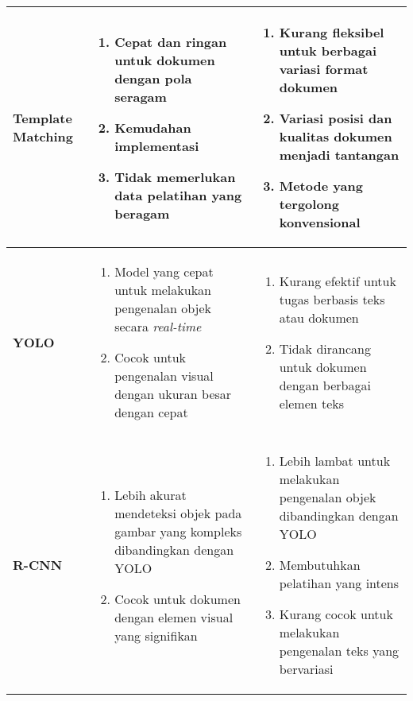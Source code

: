 \begin{table}[h!]
\begin{tabularx}{\linewidth}{|p{2cm}|X|X|}
\textbf{Template Matching} &
\begin{enumerate}
    \item Cepat dan ringan untuk dokumen dengan pola seragam
    \item Kemudahan implementasi
    \item Tidak memerlukan data pelatihan yang beragam
\end{enumerate}
&
\begin{enumerate}
    \item Kurang fleksibel untuk berbagai variasi format dokumen
    \item Variasi posisi dan kualitas dokumen menjadi tantangan
    \item Metode yang tergolong konvensional
\end{enumerate}
\\ \hline

\textbf{YOLO} &
\begin{enumerate}
    \item Model yang cepat untuk melakukan pengenalan objek secara \textit{real-time}
    \item Cocok untuk pengenalan visual dengan ukuran besar dengan cepat
\end{enumerate}
&
\begin{enumerate}
    \item Kurang efektif untuk tugas berbasis teks atau dokumen
    \item Tidak dirancang untuk dokumen dengan berbagai elemen teks
\end{enumerate}
\\ \hline
\textbf{R-CNN} &
\begin{enumerate}
    \item Lebih akurat mendeteksi objek pada gambar yang kompleks dibandingkan dengan YOLO
    \item Cocok untuk dokumen dengan elemen visual yang signifikan
\end{enumerate}
&
\begin{enumerate}
    \item Lebih lambat untuk melakukan pengenalan objek dibandingkan dengan YOLO
    \item Membutuhkan pelatihan yang intens
    \item Kurang cocok untuk melakukan pengenalan teks yang bervariasi
\end{enumerate}
\\ \hline
\end{tabularx}
\end{table}

